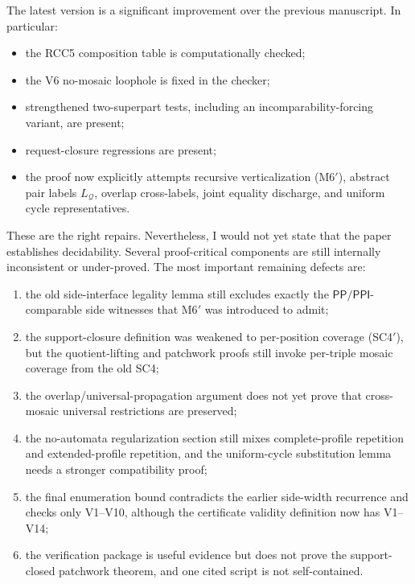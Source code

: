\documentclass[11pt]{article}
\newcommand{\PP}{\mathsf{PP}}
\newcommand{\PPI}{\mathsf{PPI}}
\newcommand{\Q}{\mathcal Q}
\begin{document}
The latest version is a significant improvement over the previous manuscript.
In particular:
\begin{itemize}[leftmargin=2em]
  \item the RCC5 composition table is computationally checked;
  \item the V6 no-mosaic loophole is fixed in the checker;
  \item strengthened two-superpart tests, including an incomparability-forcing
        variant, are present;
  \item request-closure regressions are present;
  \item the proof now explicitly attempts recursive verticalization (M6$'$),
        abstract pair labels $L_{\Q}$, overlap cross-labels, joint equality
        discharge, and uniform cycle representatives.
\end{itemize}
These are the right repairs.  Nevertheless, I would not yet state that the
paper establishes decidability.  Several proof-critical components are still
internally inconsistent or under-proved.  The most important remaining defects
are:
\begin{enumerate}[leftmargin=2em,label=(G\arabic*)]
  \item the old side-interface legality lemma still excludes exactly the
        $\PP/\PPI$-comparable side witnesses that M6$'$ was introduced to admit;
  \item the support-closure definition was weakened to per-position coverage
        (SC4$'$), but the quotient-lifting and patchwork proofs still invoke
        per-triple mosaic coverage from the old SC4;
  \item the overlap/universal-propagation argument does not yet prove that
        cross-mosaic universal restrictions are preserved;
  \item the no-automata regularization section still mixes complete-profile
        repetition and extended-profile repetition, and the uniform-cycle
        substitution lemma needs a stronger compatibility proof;
  \item the final enumeration bound contradicts the earlier side-width
        recurrence and checks only V1--V10, although the certificate validity
        definition now has V1--V14;
  \item the verification package is useful evidence but does not prove the
        support-closed patchwork theorem, and one cited script is not
        self-contained.
\end{enumerate}
\end{document}
